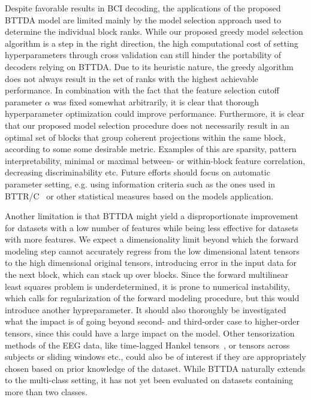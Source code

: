 \documentclass[twocolumn]{article}
\begin{document}
Despite favorable results in BCI decoding, the applications of the proposed
\textsc{BTTDA} model are limited mainly by the model selection approach used
to determine the individual block ranks.
While our proposed greedy model selection algorithm is a step in the right
direction, the high computational cost of setting hyperparameters through cross
validation can still hinder the portability of decoders relying on
\textsc{BTTDA}.
Due to its heuristic nature, the greedy algorithm does not always result in the
set of ranks with the highest achievable performance.
In combination with the fact that the feature selection cutoff parameter
$\alpha$ was fixed somewhat arbitrarily, it is clear that thorough
hyperparameter optimization could improve performance.
Furthermore, it is clear that our proposed model selection procedure does not
necessarily result in an optimal set of blocks that group coherent projections
within the same block, according to some some desirable metric.
Examples of this are sparsity, pattern interpretability, minimal or maximal between- or within-block feature
correlation, decreasing discriminability etc.
Future efforts should focus on automatic parameter setting, e.g. using
information criteria such as the ones used in BTTR/C~\cite{Faes2022} or other
statistical measures based on the models application.

Another limitation is that \textsc{BTTDA} might yield a disproportionate
improvement for datasets with a low number of features while being less effective
for datasets with more features.
We expect a dimensionality limit beyond which the forward modeling step cannot
accurately regress from the low dimensional latent tensors to the high
dimensional original tensors, introducing
error in the input data for the next block, which can stack up over blocks.
Since the forward multilinear least squares problem is underdetermined, it is prone to
numerical instability, which calls for regularization of the forward modeling
procedure, but this would introduce another hypreparameter.
It should also thoroughly be investigated what the impact is of going beyond
second- and third-order case to higher-order tensors, since this could have a large impact
on the model.
Other tensorization methods of the EEG data, like time-lagged Hankel
tensors~\cite{Papy2005}, or tensors across subjects or sliding windows etc., could also be
of interest if they are appropriately chosen based on prior knowledge of the dataset.
While \textsc{BTTDA} naturally extends to the multi-class setting, it has not yet been
evaluated on datasets containing more than two classes.
\end{document}
